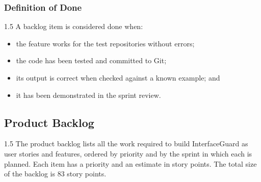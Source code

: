 \documentclass[12pt,a4paper]{article}
\begin{document}
\subsubsection{Definition of Done}

\begin{spacing}{1.5}
\justifying
A backlog item is considered done when:

\begin{itemize}[leftmargin=*,itemsep=2pt]
  \item the feature works for the test repositories without errors;
  \item the code has been tested and committed to Git;
  \item its output is correct when checked against a known example; and
  \item it has been demonstrated in the sprint review.
\end{itemize}
\end{spacing}

\subsection{Product Backlog}

\begin{spacing}{1.5}
\justifying
The product backlog lists all the work required to build InterfaceGuard as
user stories and features, ordered by priority and by the sprint in which each
is planned. Each item has a priority and an estimate in story points. The
total size of the backlog is 83 story points.
\end{spacing}
\end{document}
